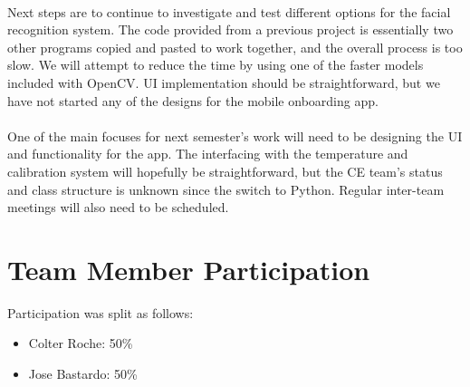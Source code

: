 \documentclass[12pt, letterpaper]{article}
\begin{document}
    \paragraph{}
    Next steps are to continue to investigate and test different options for the facial 
    recognition system.  The code provided from a previous project is essentially two other 
    programs copied and pasted to work together, and the overall process is too slow.  We will 
    attempt to reduce the time by using one of the faster models included with OpenCV.  
    UI implementation should be straightforward, but we have not started any of the 
    designs for the mobile onboarding app.  
    \paragraph{}
    One of the main focuses for next semester’s work 
    will need to be designing the UI and functionality for the app.  The interfacing with the 
    temperature and calibration system will hopefully be straightforward, but the CE team’s 
    status and class structure is unknown since the switch to Python.  Regular inter-team 
    meetings will also need to be scheduled.
    \section{Team Member Participation}
    Participation was split as follows:
    \begin{itemize}
        \item Colter Roche: 50\%
        \item Jose Bastardo: 50\%
    \end{itemize}
\end{document}
